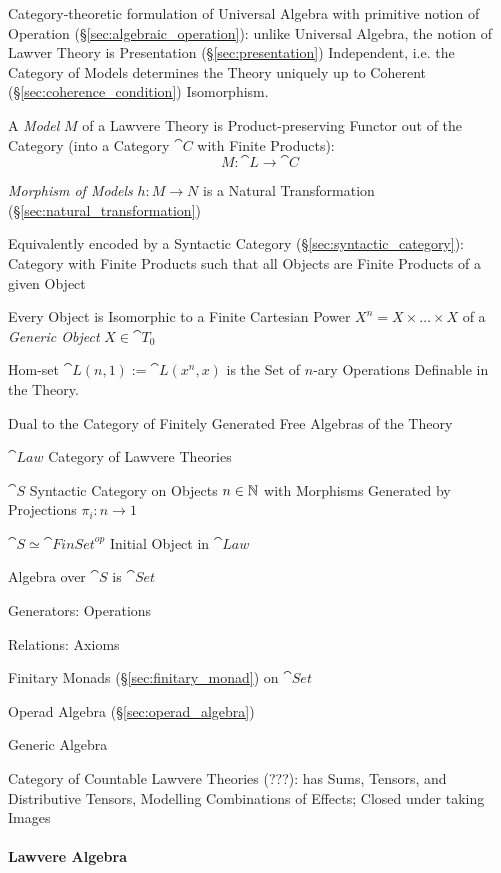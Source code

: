 Category-theoretic formulation of Universal Algebra with primitive
notion of Operation (\S\ref{sec:algebraic_operation}): unlike
Universal Algebra, the notion of Lawver Theory is Presentation
(\S\ref{sec:presentation}) Independent, i.e. the Category of Models
determines the Theory uniquely up to Coherent
(\S\ref{sec:coherence_condition}) Isomorphism. \cite{hyland-power06}

A \emph{Model} $M$ of a Lawvere Theory is Product-preserving Functor
out of the Category (into a Category $\cat{C}$ with Finite Products):
\[
  M : \cat{L} \rightarrow \cat{C}
\]

\emph{Morphism of Models} $h : M \rightarrow N$ is a Natural
Transformation (\S\ref{sec:natural_transformation})

Equivalently encoded by a Syntactic Category
(\S\ref{sec:syntactic_category}): Category with Finite Products such
that all Objects are Finite Products of a given Object

Every Object is Isomorphic to a Finite Cartesian Power $X^n = X \times
\ldots \times X$ of a \emph{Generic Object} $X \in \cat{T}_0$

Hom-set $\cat{L}(n,1) := \cat{L}(x^n,x)$ is the Set of $n$-ary
Operations Definable in the Theory.

Dual to the Category of Finitely Generated Free Algebras of the Theory

$\cat{Law}$ Category of Lawvere Theories

$\cat{S}$ Syntactic Category on Objects $n \in \mathbb{N}$ with Morphisms
Generated by Projections $\pi_i : n \rightarrow 1$

$\cat{S} \simeq \cat{FinSet}^{op}$ Initial Object in $\cat{Law}$

Algebra over $\cat{S}$ is $\cat{Set}$

Generators: Operations

Relations: Axioms

Finitary Monads (\S\ref{sec:finitary_monad}) on $\cat{Set}$

Operad Algebra (\S\ref{sec:operad_algebra})

Generic Algebra

Category of Countable Lawvere Theories (???): has Sums, Tensors, and
Distributive Tensors, Modelling Combinations of Effects; Closed under
taking Images \cite{hyland-power06}



\paragraph{Lawvere Algebra}\label{sec:lawvere_algebra}
\hfill \\


